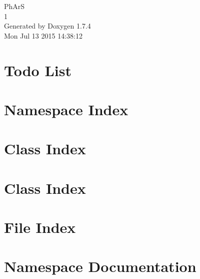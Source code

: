 \documentclass[a4paper]{book}
\begin{document}
\hypersetup{pageanchor=false}
\begin{titlepage}
\vspace*{7cm}
\begin{center}
{\Large PhArS \\[1ex]\large 1 }\\
\vspace*{1cm}
{\large Generated by Doxygen 1.7.4}\\
\vspace*{0.5cm}
{\small Mon Jul 13 2015 14:38:12}\\
\end{center}
\end{titlepage}
\clearemptydoublepage
{}
\tableofcontents
\clearemptydoublepage
{}
\hypersetup{pageanchor=true}
\chapter{Todo List}
\label{todo}
\hypertarget{todo}{}

\chapter{Namespace Index}

\chapter{Class Index}

\chapter{Class Index}

\chapter{File Index}

\chapter{Namespace Documentation}






























\end{document}
